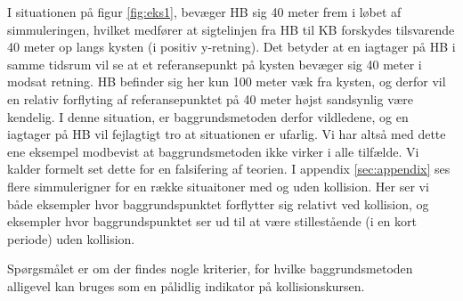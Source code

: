 \documentclass[%
 reprint,
nofootinbib,
aps,
]{revtex4-1}
\begin{document}
I situationen på figur \ref{fig:eks1}, bevæger HB sig 40 meter frem i løbet af simmuleringen, hvilket medfører at sigtelinjen fra HB til KB forskydes tilsvarende 40 meter op langs kysten (i positiv y-retning). Det betyder at en iagtager på HB i samme tidsrum vil se at et referansepunkt på kysten bevæger sig 40 meter i modsat retning. HB befinder sig her kun 100 meter væk fra kysten, og derfor vil en relativ forflyting af referansepunktet på 40 meter højst sandsynlig være kendelig. I denne situation, er baggrundsmetoden derfor vildledene, og en iagtager på HB vil fejlagtigt tro at situationen er ufarlig. Vi har altså med dette ene eksempel modbevist at baggrundsmetoden ikke virker i alle tilfælde. Vi kalder formelt set dette for en falsifering af teorien. I appendix \ref{sec:appendix} ses flere simmulerigner for en række situaitoner med og uden kollision. Her ser vi både eksempler hvor baggrundspunktet forflytter sig relativt ved kollision, og eksempler hvor baggrundspunktet ser ud til at være stillestående (i en kort periode) uden kollision. \par
Spørgsmålet er om der findes nogle kriterier, for hvilke baggrundsmetoden alligevel kan bruges som en pålidlig indikator på kollisionskursen.
\end{document}
